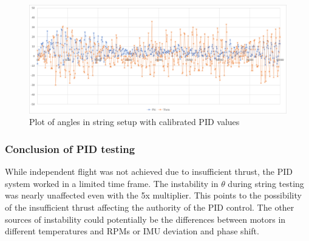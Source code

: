 \begin{figure}[h]
    \centering
    \includegraphics[width=\textwidth]{pictures/graphs/ZN10P5DT4The5.png}
    \caption{Plot of angles in string setup with calibrated PID values}
    \label{fig:ZN10P}
\end{figure}

\subsubsection{Conclusion of PID testing}

While independent flight was not achieved due to insufficient thrust, the PID system worked in a limited time frame. The instability in $\theta$ during string testing was nearly unaffected even with the 5x multiplier. This points to the possibility of the insufficient thrust affecting the authority of the PID control.
The other sources of instability could potentially be the differences between motors in different temperatures and RPMs or IMU deviation and phase shift.
